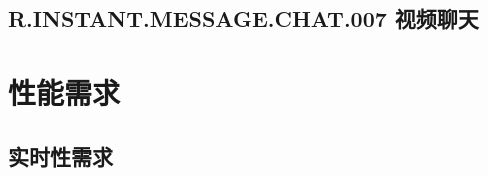 \subsection{R.INSTANT.MESSAGE.CHAT.007 视频聊天}



\section{性能需求}

\subsection{实时性需求}
% 
% 
% 
% 
% 
% 
% 
% 
% 
% 

